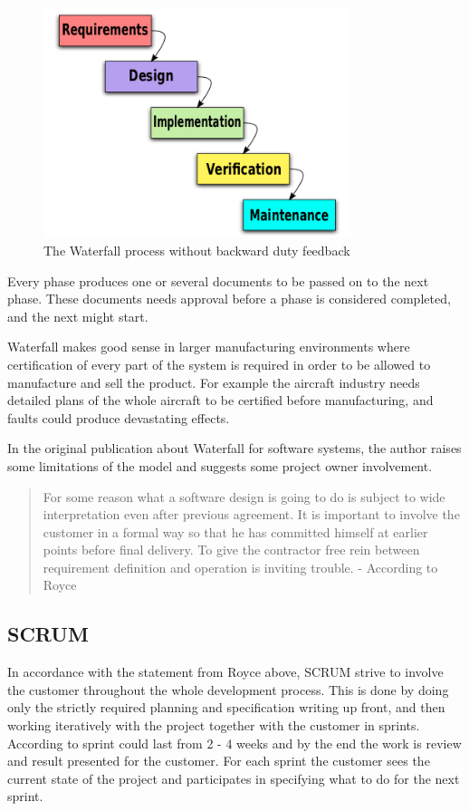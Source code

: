 \documentclass[11pt]{book}
\begin{document}
\begin{figure}[H]
      \centering
      \includegraphics[width=0.8\textwidth]{Figures/Prestudy/Waterfall.png}
      \caption{The Waterfall process \cite{wikipedia:waterfall} without backward duty feedback}
      \label{fig:pre_waterfall}
\end{figure}

Every phase produces one or several documents to be passed on to the next phase. These documents needs approval before a phase is considered completed, and the next might start.

Waterfall makes good sense in larger manufacturing environments where certification of every part of the system is required in order to be allowed to manufacture and sell the product. For example the aircraft industry needs detailed plans of the whole aircraft to be certified before manufacturing, and faults could produce devastating effects.

In the original publication about Waterfall for software systems, the author raises some limitations of the model and suggests some project owner involvement.

\begin{quotation}\noindent
For some reason what a software design is going to do is subject to wide interpretation even after previous agreement. It is important to involve the customer in a formal way so that he has committed himself at earlier points before final delivery. To give the contractor free rein between requirement definition and operation is inviting trouble. - According to Royce \cite[p. 335]{DBLP:conf/icse/Royce87}
\end{quotation}

\subsection{SCRUM}
In accordance with the statement from Royce above, SCRUM strive to involve the customer throughout the whole development process. This is done by doing only the strictly required planning and specification writing up front, and then working iteratively with the project together with the customer in sprints. According to \cite[p. 73]{Sommerville10} sprint could last from 2 - 4 weeks and by the end the work is review and result presented for the customer. For each sprint the customer sees the current state of the project and participates in specifying what to do for the next sprint.
\end{document}
